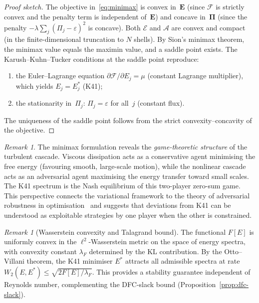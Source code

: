 \documentclass[12pt,a4paper]{article}
\theoremstyle{definition}
\theoremstyle{plain}
\theoremstyle{remark}
\newtheorem{remark}[definition]{Remark}
\begin{document}
\begin{proof}[Proof sketch]
The objective in~\eqref{eq:minimax} is convex in~$\mathbf{E}$ (since
$\mathcal{F}$ is strictly convex and the penalty term is independent
of~$\mathbf{E}$) and concave in~$\boldsymbol{\Pi}$ (since the penalty
$-\lambda\sum_j(\Pi_j - \varepsilon)^2$ is concave).  Both
$\mathcal{E}$ and $\mathcal{A}$ are convex and compact (in the
finite-dimensional truncation to $N$ shells).  By Sion's minimax
theorem, the minimax value equals the maximin value, and a saddle point
exists.  The Karush--Kuhn--Tucker conditions at the saddle point
reproduce:
\begin{enumerate}[label=(\roman*)]
  \item the Euler--Lagrange equation
    $\partial\mathcal{F}/\partial E_j = \mu$ (constant Lagrange
    multiplier), which yields $E_j = E_j^*$ (K41);
  \item the stationarity in~$\Pi_j$:
    $\Pi_j = \varepsilon$ for all~$j$ (constant flux).
\end{enumerate}
The uniqueness of the saddle point follows from the strict
convexity--concavity of the objective.
\end{proof}

\begin{remark}
The minimax formulation reveals the \emph{game-theoretic structure}
of the turbulent cascade.  Viscous dissipation acts as a conservative
agent minimising the free energy (favouring smooth, large-scale
motion), while the nonlinear cascade acts as an adversarial agent
maximising the energy transfer toward small scales.  The K41 spectrum
is the Nash equilibrium of this two-player zero-sum game.
This perspective connects the variational framework to the theory of
adversarial robustness in optimisation~\cite{Rockafellar70} and
suggests that deviations from K41 can be understood as exploitable
strategies by one player when the other is constrained.
\end{remark}

\begin{remark}[Wasserstein convexity and Talagrand bound]
\label{rem:talagrand}
The functional $F[E]$ is uniformly convex in the $\ell^2$-Wasserstein metric on the space of energy spectra, with convexity constant $\lambda_F$ determined by the KL contribution. By the Otto--Villani theorem, the K41 minimiser $E^*$ attracts all admissible spectra at rate $W_2(E, E^*) \leq \sqrt{2 F[E] / \lambda_F}$. This provides a stability guarantee independent of Reynolds number, complementing the DFC-slack bound (Proposition~\ref{prop:dfc-slack}).
\end{remark}
\end{document}
